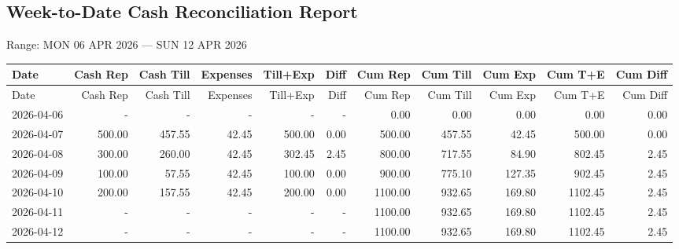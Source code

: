 \documentclass[11pt]{article}
\begin{document}
\begin{landscape}

\section*{Week-to-Date Cash Reconciliation Report}
\noindent
Range: MON 06 APR 2026 --- SUN 12 APR 2026

\bigskip

\footnotesize
\setlength{\LTleft}{0pt}
\setlength{\LTright}{0pt}

\begin{longtable}{p{3.2cm} r r r r r | r r r r r}
\toprule
Date & Cash Rep & Cash Till & Expenses & Till+Exp & Diff & Cum Rep & Cum Till & Cum Exp & Cum T+E & Cum Diff \\
\midrule
\endfirsthead

\toprule
Date & Cash Rep & Cash Till & Expenses & Till+Exp & Diff & Cum Rep & Cum Till & Cum Exp & Cum T+E & Cum Diff \\
\midrule
\endhead

\bottomrule
\endfoot

2026-04-06 & - & - & - & - & - & 0.00 & 0.00 & 0.00 & 0.00 & 0.00 \\ \hline
2026-04-07 & 500.00 & 457.55 & 42.45 & 500.00 & 0.00 & 500.00 & 457.55 & 42.45 & 500.00 & 0.00 \\ \hline
2026-04-08 & 300.00 & 260.00 & 42.45 & 302.45 & 2.45 & 800.00 & 717.55 & 84.90 & 802.45 & 2.45 \\ \hline
2026-04-09 & 100.00 & 57.55 & 42.45 & 100.00 & 0.00 & 900.00 & 775.10 & 127.35 & 902.45 & 2.45 \\ \hline
2026-04-10 & 200.00 & 157.55 & 42.45 & 200.00 & 0.00 & 1100.00 & 932.65 & 169.80 & 1102.45 & 2.45 \\ \hline
2026-04-11 & - & - & - & - & - & 1100.00 & 932.65 & 169.80 & 1102.45 & 2.45 \\ \hline
2026-04-12 & - & - & - & - & - & 1100.00 & 932.65 & 169.80 & 1102.45 & 2.45 \\ \hline
\end{longtable}

\end{landscape}
\end{document}
